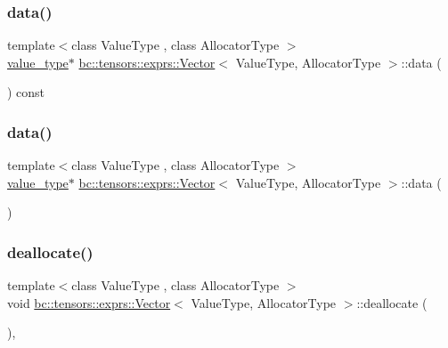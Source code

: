 \subsubsection{\texorpdfstring{data()}{data()}\hspace{0.1cm}{\footnotesize\ttfamily [1/2]}}
{\footnotesize\ttfamily template$<$class Value\+Type , class Allocator\+Type $>$ \\
\hyperlink{structbc_1_1tensors_1_1exprs_1_1Vector_a61ba759af8b26329103ce2b0765dade5}{value\+\_\+type}$\ast$ \hyperlink{structbc_1_1tensors_1_1exprs_1_1Vector}{bc\+::tensors\+::exprs\+::\+Vector}$<$ Value\+Type, Allocator\+Type $>$\+::data (\begin{DoxyParamCaption}{ }\end{DoxyParamCaption}) const\hspace{0.3cm}{\ttfamily [inline]}}

\mbox{\label{structbc_1_1tensors_1_1exprs_1_1Vector_a2484a59b041fafbbeb45b00a34e4702f}} 
\subsubsection{\texorpdfstring{data()}{data()}\hspace{0.1cm}{\footnotesize\ttfamily [2/2]}}
{\footnotesize\ttfamily template$<$class Value\+Type , class Allocator\+Type $>$ \\
\hyperlink{structbc_1_1tensors_1_1exprs_1_1Vector_a61ba759af8b26329103ce2b0765dade5}{value\+\_\+type}$\ast$ \hyperlink{structbc_1_1tensors_1_1exprs_1_1Vector}{bc\+::tensors\+::exprs\+::\+Vector}$<$ Value\+Type, Allocator\+Type $>$\+::data (\begin{DoxyParamCaption}{ }\end{DoxyParamCaption})\hspace{0.3cm}{\ttfamily [inline]}}

\mbox{\label{structbc_1_1tensors_1_1exprs_1_1Vector_a33063c3d12ae3ce08ab16f1d74be3558}} 
\subsubsection{\texorpdfstring{deallocate()}{deallocate()}}
{\footnotesize\ttfamily template$<$class Value\+Type , class Allocator\+Type $>$ \\
void \hyperlink{structbc_1_1tensors_1_1exprs_1_1Vector}{bc\+::tensors\+::exprs\+::\+Vector}$<$ Value\+Type, Allocator\+Type $>$\+::deallocate (\begin{DoxyParamCaption}{ }\end{DoxyParamCaption})\hspace{0.3cm}{\ttfamily [inline]}, {\ttfamily [protected]}}


